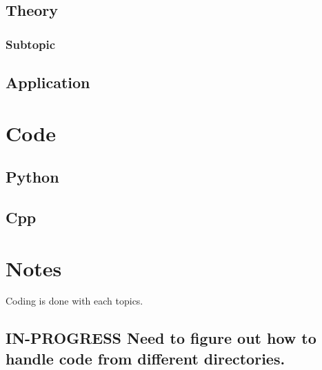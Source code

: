 \documentclass[11pt]{article}
\begin{document}
\subsection{Theory}
\label{sec:orged38cc0}
\subsubsection{Subtopic}
\label{sec:org62de67e}
\subsection{Application}
\label{sec:orgd47371c}
\section{Code}
\label{sec:org5d7eb54}
\subsection{Python}
\label{sec:orgfaead74}
\subsection{Cpp}
\label{sec:orge6c6819}



\section{Notes}
\label{sec:org302f8d8}
Coding is done with each topics.
\subsection{{\bfseries\sffamily IN-PROGRESS} Need to figure out how to handle code from different directories.}
\label{sec:org48483bb}
\end{document}
